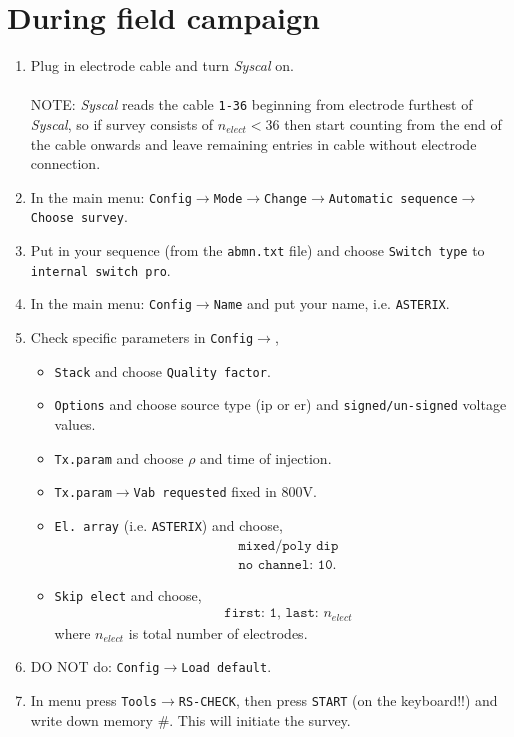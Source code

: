 \documentclass[a4paper,12pt]{article}
\begin{document}
\section*{During field campaign}
\begin{enumerate}
\item Plug in electrode cable and turn {\it Syscal} on. 
\\\\
NOTE: {\it Syscal} reads the cable \texttt{1-36} beginning from electrode furthest of {\it Syscal}, so if survey consists of $n_{elect}<36$ then start counting from the end of the cable onwards and leave remaining entries in cable without electrode connection.
\item In the main menu: \texttt{Config$\to$Mode$\to$Change$\to$Automatic sequence$\to$Choose survey}.
\item Put in your sequence (from the \texttt{abmn.txt} file) and choose \texttt{Switch type} to \texttt{internal switch pro}.
\item In the main menu: \texttt{Config$\to$Name} and put your name, i.e. \texttt{ASTERIX}.
\item Check specific parameters in \texttt{Config$\to$},
\begin{itemize}
\item \texttt{Stack} and choose \texttt{Quality factor}.
\item \texttt{Options} and choose source type (ip or er) and \texttt{signed/un-signed} voltage values.
\item \texttt{Tx.param} and choose $\rho$ and time of injection.
\item \texttt{Tx.param$\to$Vab requested} fixed in 800V.
\item \texttt{El. array} (i.e. \texttt{ASTERIX}) and choose,
\begin{align*}
&\texttt{mixed/poly dip}\\
&\texttt{no channel: 10}.
\end{align*}
\item \texttt{Skip elect} and choose,
\begin{align*}
&\texttt{first: 1, last: $n_{elect}$} 
\end{align*}
where $n_{elect}$ is total number of electrodes. 
\end{itemize}
\item DO NOT do: \texttt{Config$\to$Load default}.
\item In menu press \texttt{Tools$\to$RS-CHECK}, then press \texttt{START} (on the keyboard!!) and write down memory \#. This will initiate the survey.
\end{enumerate}
\clearpage
\end{document}
